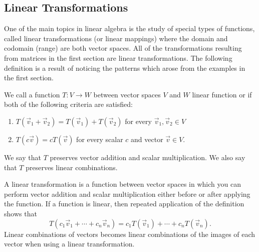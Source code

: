 \subsection{Linear Transformations}
One of the main topics in linear algebra is the study of special types of functions, called linear transformations (or linear mappings) where the domain and codomain (range) are both vector spaces.  All of the transformations resulting from matrices in the first section are linear transformations.  The following definition is a result of noticing the patterns which arose from the examples in the first section.
\begin{definition}
We call a function $T\colon V\to W$ between vector spaces $V$ and $W$ linear function or  if both of the following criteria are satisfied:
\begin{enumerate}
	\item $T(\vec v_1+\vec v_2)=T(\vec v_1)+T(\vec v_2)$ for every $\vec v_1,\vec v_2\in V$
	\item $T(c\vec v)=cT(\vec v)$ for every scalar $c$ and vector $\vec v\in V$.
\end{enumerate}
We say that $T$ preserves vector addition and scalar multiplication.  We also say that $T$ preserves linear combinations.
\end{definition}
%
A linear transformation is a function between vector spaces in which you can perform vector addition and scalar multiplication  either before or after applying the function. 
If a function is linear, then repeated application of the definition shows that $$T(c_1\vec v_1+\cdots +c_n\vec v_n) = c_1T(\vec v_1)+\cdots +c_nT(\vec v_n).$$ Linear combinations of vectors becomes linear combinations of the images of each vector when using a linear transformation.  

